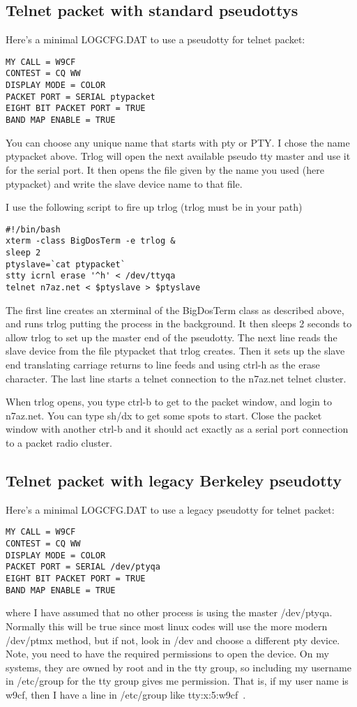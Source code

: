 \documentclass[12pt]{article}
\begin{document}
\subsection{Telnet packet with standard pseudottys}
Here's a minimal LOGCFG.DAT to use a pseudotty for telnet packet:
\begin{verbatim}
MY CALL = W9CF
CONTEST = CQ WW
DISPLAY MODE = COLOR
PACKET PORT = SERIAL ptypacket
EIGHT BIT PACKET PORT = TRUE
BAND MAP ENABLE = TRUE
\end{verbatim}

You can choose any unique name that starts with pty or PTY.  I chose
the name ptypacket above. Trlog will
open the next available pseudo tty master and use it for the serial
port. It then opens the file given by the name you used (here ptypacket)
and write the slave device name to that file.

I use the following script to fire up trlog (trlog must be in your path)
\begin{verbatim}
#!/bin/bash
xterm -class BigDosTerm -e trlog &
sleep 2
ptyslave=`cat ptypacket`
stty icrnl erase '^h' < /dev/ttyqa
telnet n7az.net < $ptyslave > $ptyslave
\end{verbatim}
The first line creates an xterminal of the BigDosTerm class as described
above, and runs trlog putting the process in the background.
It then sleeps 2 seconds to allow trlog to set up the master end of the
pseudotty. The next line reads the slave device from the
file ptypacket that trlog creates. Then it sets up the slave end translating
carriage returns to line feeds and using ctrl-h as the erase character.
The last line starts a telnet connection to the n7az.net telnet cluster.

When trlog opens, you type ctrl-b to get to the packet window, and login
to n7az.net. You can type sh/dx to get some spots to start. Close the
packet window with another ctrl-b and it should act exactly as a serial
port connection to a packet radio cluster.

\subsection{Telnet packet with legacy Berkeley pseudotty}
Here's a minimal LOGCFG.DAT to use a legacy pseudotty for telnet packet:
\begin{verbatim}
MY CALL = W9CF
CONTEST = CQ WW
DISPLAY MODE = COLOR
PACKET PORT = SERIAL /dev/ptyqa
EIGHT BIT PACKET PORT = TRUE
BAND MAP ENABLE = TRUE
\end{verbatim}
where I have assumed that no other process is using the master /dev/ptyqa.
Normally this will be true since most linux codes will use the more
modern /dev/ptmx method, but if not, look in /dev and choose a different
pty device. Note, you need to have the required permissions to open the
device. On my systems, they are owned by root and in the tty group, so
including my username in /etc/group for the tty group gives me permission.
That is, if my user name is w9cf, then I have a line in /etc/group
like tty:x:5:w9cf\ .
\end{document}
